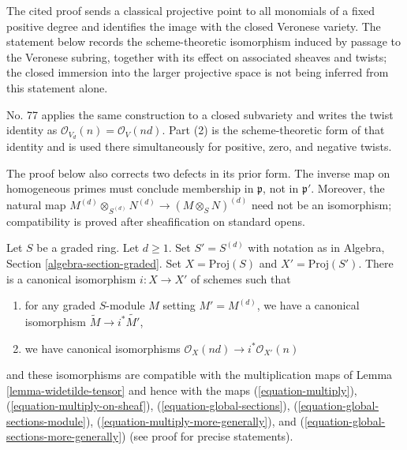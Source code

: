 \begin{lemma}
\label{lemma-d-uple}
\begin{reference}
\cite[Chapter III, \S 1, no. 52, Lemma 2, p. 245]{FAC}
\cite[Chapter III, \S 5, no. 77, proof of Proposition 4,
pp. 272--273]{FAC}
\end{reference}
\begin{history}
The cited proof sends a classical projective point to all monomials of a
fixed positive degree and identifies the image with the closed Veronese
variety. The statement below records the scheme-theoretic isomorphism induced
by passage to the Veronese subring, together with its effect on associated
sheaves and twists; the closed immersion into the larger projective space is
not being inferred from this statement alone.

No. 77 applies the same construction to a closed subvariety and writes the
twist identity as $\mathcal O_{V_d}(n)=\mathcal O_V(nd)$. Part (2) is the
scheme-theoretic form of that identity and is used there simultaneously for
positive, zero, and negative twists.

The proof below also corrects two defects in its prior form. The inverse map
on homogeneous primes must conclude membership in $\mathfrak p$, not in
$\mathfrak p'$. Moreover, the natural map
$M^{(d)}\otimes_{S^{(d)}}N^{(d)}\to(M\otimes_SN)^{(d)}$ need not be an
isomorphism; compatibility is proved after sheafification on standard opens.
\end{history}
Let $S$ be a graded ring. Let $d \geq 1$. Set $S' = S^{(d)}$ with notation
as in Algebra, Section \ref{algebra-section-graded}. Set
$X = \text{Proj}(S)$ and $X' = \text{Proj}(S')$. There is a canonical
isomorphism $i : X \to X'$ of schemes such that
\begin{enumerate}
\item for any graded $S$-module $M$ setting $M' = M^{(d)}$,
we have a canonical isomorphism $\widetilde{M} \to i^*\widetilde{M'}$,
\item we have canonical isomorphisms
$\mathcal{O}_{X}(nd) \to i^*\mathcal{O}_{X'}(n)$
\end{enumerate}
and these isomorphisms are compatible with the multiplication maps
of Lemma \ref{lemma-widetilde-tensor} and hence with the maps
(\ref{equation-multiply}),
(\ref{equation-multiply-on-sheaf}),
(\ref{equation-global-sections}),
(\ref{equation-global-sections-module}),
(\ref{equation-multiply-more-generally}), and
(\ref{equation-global-sections-more-generally}) (see proof for precise
statements).
\end{lemma}


